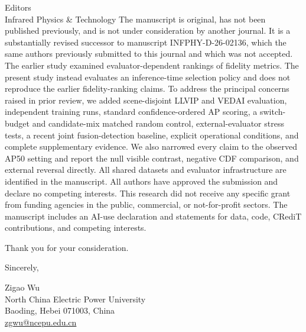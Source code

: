 \documentclass[a4paper,10pt]{letter}
\begin{document}
\begin{letter}{Editors\\Infrared Physics \& Technology}
The manuscript is original, has not been published previously, and is not under
consideration by another journal. It is a substantially revised successor to
manuscript INFPHY-D-26-02136, which the same authors previously submitted to
this journal and which was not accepted. The earlier study examined
evaluator-dependent rankings of fidelity metrics. The present study instead
evaluates an inference-time selection policy and does not reproduce the earlier
fidelity-ranking claims. To address the principal concerns raised in prior
review, we added scene-disjoint LLVIP and VEDAI evaluation, independent training
runs, standard confidence-ordered AP scoring, a switch-budget and candidate-mix
matched random control, external-evaluator stress tests, a recent joint
fusion-detection baseline, explicit operational conditions, and complete
supplementary evidence. We also narrowed every claim to the observed AP50
setting and report the null visible contrast, negative CDF comparison, and
external reversal directly. All shared datasets and evaluator infrastructure
are identified in the manuscript. All authors have approved the submission and
declare no competing interests. This research did not receive any specific
grant from funding agencies in the public, commercial, or not-for-profit
sectors. The manuscript includes an AI-use declaration and statements for data,
code, CRediT contributions, and competing interests.

Thank you for your consideration.

\closing{Sincerely,}
Zigao Wu\\
North China Electric Power University\\
Baoding, Hebei 071003, China\\
\href{mailto:zgwu@ncepu.edu.cn}{zgwu@ncepu.edu.cn}
\end{letter}
\end{document}
